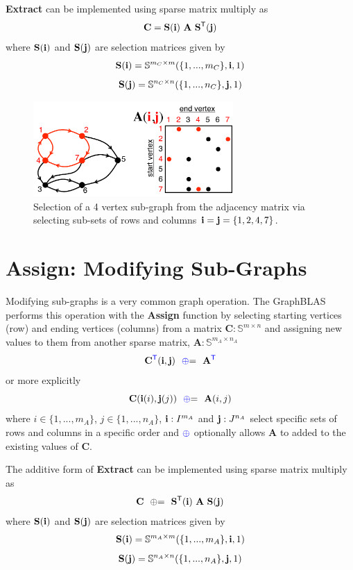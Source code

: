   {\bf Extract} can be implemented using sparse matrix multiply as
$$
   \mathbf{C}= \mathbf{S}({\bf i}) ~ \mathbf{A} ~ \mathbf{S}^{\sf T}({\bf j})
$$
where $\mathbf{S}({\bf i})$ and $\mathbf{S}({\bf j})$ are selection matrices given by
$$
   \mathbf{S}({\bf i}) = \mathbb{S}^{m_C \times m}(\{1,...,m_C\},{\bf i},1)
$$
$$
    \mathbf{S}({\bf j}) = \mathbb{S}^{n_C \times n}(\{1,...,n_C\},{\bf j},1)
$$

\begin{figure}[!htb]
  \centering
    \includegraphics[width=3in]{figures/AdjacencyMatrixSub.pdf}
      \caption{Selection of a 4 vertex sub-graph from the adjacency matrix via selecting sub-sets of rows and columns ${\bf i} = {\bf j} = \{1,2,4,7\}$.}
      \label{fig:AdjacencyMatrixSub}
\end{figure}

\section{Assign: Modifying Sub-Graphs}
  Modifying sub-graphs is a very common graph operation.  The GraphBLAS performs this operation with the {\bf Assign} function by selecting starting vertices (row) and ending vertices (columns) from a matrix $\mathbf{C} : \mathbb{S}^{m \times n}$ and assigning new values to them from another sparse matrix, $\mathbf{A} : \mathbb{S}^{m_A \times n_A}$
$$
   \mathbf{C}^{\textcolor{blue}{\sf T}}({\bf i},{\bf j}) ~~ {\textcolor{blue}{\oplus}}{=} ~~ \mathbf{A}^{\textcolor{blue}{\sf T}}
$$
or more explicitly
$$
   {\bf C}({\bf i}(i),{\bf j}(j)) ~~ {\textcolor{blue}{\oplus}}{=} ~~{\bf A}(i,j) 
$$
where $i \in \{1,...,m_A\}$, $j \in \{1,...,n_A\}$, ${\bf i} : I^{m_A}$ and ${\bf j}: J^{n_A}$ select specific sets of rows and columns in a specific order and ${\textcolor{blue}{\oplus}}$ optionally allows $\mathbf{A}$ to added to the existing values of $\mathbf{C}$. 

  The additive form of {\bf Extract} can be implemented using sparse matrix multiply as
$$
   \mathbf{C} ~~ {\oplus}{=} ~~ \mathbf{S}^{\sf T}({\bf i}) ~ \mathbf{A} ~ \mathbf{S}({\bf j})
$$
where $\mathbf{S}({\bf i})$ and $\mathbf{S}({\bf j})$ are selection matrices given by
$$
   \mathbf{S}({\bf i}) = \mathbb{S}^{m_A \times m}(\{1,...,m_A\},{\bf i},1)
$$
$$
    \mathbf{S}({\bf j}) = \mathbb{S}^{n_A \times n}(\{1,...,n_A\},{\bf j},1)
$$
  


